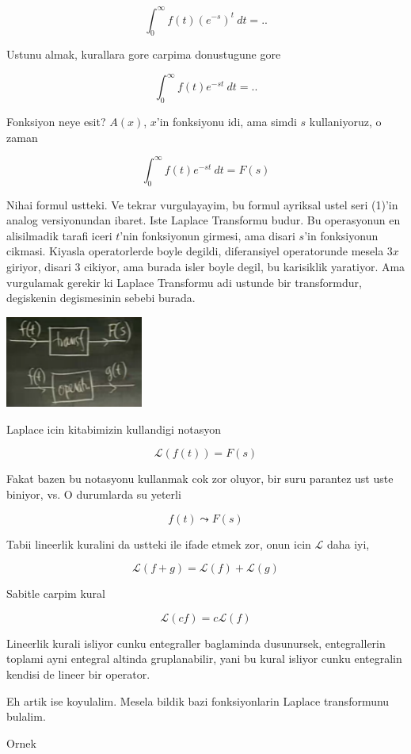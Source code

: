 \documentclass[12pt,fleqn]{article}\usepackage{../common}
\begin{document}
\[ \int_0^{\infty} f(t)(e^{-s})^t \ dt = ..\]

Ustunu almak, kurallara gore carpima donustugune gore

\[ \int_0^{\infty} f(t)e^{-st} \ dt = ..\]

Fonksiyon neye esit? $A(x)$, $x$'in fonksiyonu idi, ama simdi $s$
kullaniyoruz, o zaman 

\[ \int_0^{\infty} f(t)e^{-st} \ dt = F(s)\]

Nihai formul ustteki. Ve tekrar vurgulayayim, bu formul ayriksal ustel seri
(1)'in analog versiyonundan ibaret. Iste Laplace Transformu budur. Bu
operasyonun en alisilmadik tarafi iceri $t$'nin fonksiyonun girmesi, ama
disari $s$'in fonksiyonun cikmasi. Kiyasla operatorlerde boyle degildi,
diferansiyel operatorunde mesela $3x$ giriyor, disari $3$ cikiyor, ama
burada isler boyle degil, bu karisiklik yaratiyor. Ama vurgulamak gerekir
ki Laplace Transformu adi ustunde bir transformdur, degiskenin degismesinin
sebebi burada. 

\includegraphics[height=3cm]{19_1.png}

Laplace icin kitabimizin kullandigi notasyon 

\[ \mathcal{L}(f(t)) = F(s) \]

Fakat bazen bu notasyonu kullanmak cok zor oluyor, bir suru parantez ust
uste biniyor, vs. O durumlarda su yeterli

\[ f(t) \leadsto F(s) \]

Tabii lineerlik kuralini da ustteki ile ifade etmek zor, onun icin
$\mathcal{L}$ daha iyi, 

\[ \mathcal{L}(f+g) = \mathcal{L}(f) + \mathcal{L}(g) \]

Sabitle carpim kural 

\[ \mathcal{L}(cf) = c \mathcal{L}(f)  \]

Lineerlik kurali isliyor cunku entegraller baglaminda dusunursek,
entegrallerin toplami ayni entegral altinda gruplanabilir, yani bu kural
isliyor cunku entegralin kendisi de lineer bir operator. 

Eh artik ise koyulalim. Mesela bildik bazi fonksiyonlarin Laplace
transformunu bulalim. 

Ornek
\end{document}

